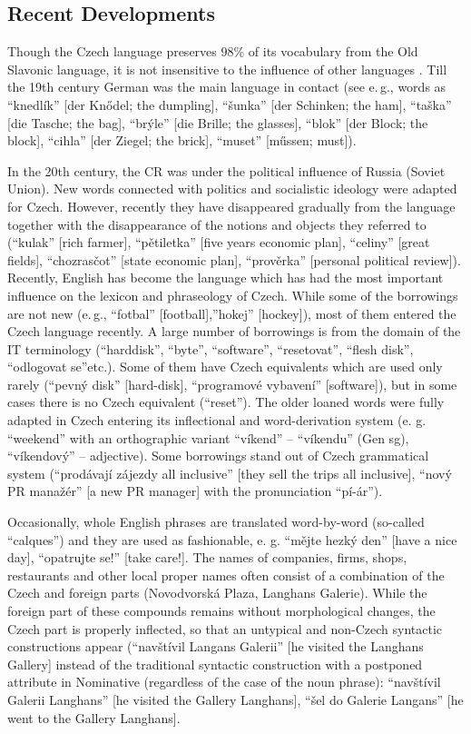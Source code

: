 \begin{multicols}{2}
\subsection{Recent Developments}

Though the Czech language preserves 98\% of its vocabulary from the Old Slavonic language, it is not insensitive to the influence of other languages \cite{Note5}. Till the 19th century German was the main language in contact (see e.\,g., words as “knedlík” {[}der Knődel; the dumpling{]}, “šunka” {[}der Schinken; the ham{]}, “taška” {[}die Tasche; the bag{]}, “brýle” {[}die Brille; the glasses{]}, “blok” {[}der Block; the block{]}, “cihla” {[}der Ziegel; the brick{]}, “muset” {[}műssen; must{]}).

In the 20th century, the CR was under the political influence of Russia (Soviet Union). New words connected with politics and socialistic ideology were adapted for Czech. However, recently they have disappeared gradually from the language together with the disappearance of the notions and objects they referred to (“kulak” {[}rich farmer{]}, “pětiletka” {[}five years economic plan{]}, “celiny” {[}great fields{]}, “chozrasčot” {[}state economic plan{]},  “prověrka” {[}personal political review{]}).
Recently, English has become the language which has had the most important influence on the lexicon and phraseology of Czech. While some of the borrowings are not new (e.\,g., “fotbal” {[}football{]},”hokej” {[}hockey{]}), most of them entered the Czech language recently. A large number of borrowings is from the domain of the IT terminology (“harddisk”, “byte”, “software”, “resetovat”, “flesh disk”, “odlogovat se”etc.). Some of them have Czech equivalents which are used only rarely (“pevný disk” {[}hard-disk{]}, “programové vybavení” {[}software{]}), but in some cases there is no Czech equivalent (“reset”).
The older loaned words were fully adapted in Czech entering its inflectional and word-derivation system (e. g. “weekend” with an orthographic variant “víkend” – “víkendu” (Gen sg), “víkendový” – adjective). Some borrowings stand out of Czech grammatical system (“prodávají zájezdy all inclusive” {[}they sell the trips all inclusive{]}, “nový PR manažér” {[}a new PR manager{]} with the pronunciation “pí-ár”).

Occasionally, whole English phrases are translated word-by-word (so-called “calques”) and they are used as fashionable, e. g. “mějte hezký den” {[}have a nice day{]}, “opatrujte se!” {[}take care!{]}. The names of companies, firms, shops, restaurants and other local proper names often consist of a combination of the Czech and foreign parts (Novodvorská Plaza, Langhans Galerie). While the foreign part of these compounds remains without morphological changes, the Czech part is properly inflected, so that an untypical and non-Czech syntactic constructions appear (“navštívil Langans Galerii” {[}he visited the Langhans Gallery{]} instead of the traditional syntactic construction with a postponed attribute in Nominative (regardless of the case of the noun phrase): “navštívil Galerii Langhans” {[}he visited the Gallery Langhans{]}, “šel do Galerie Langans” {[}he went to the Gallery Langhans{]}.


\end{multicols}
